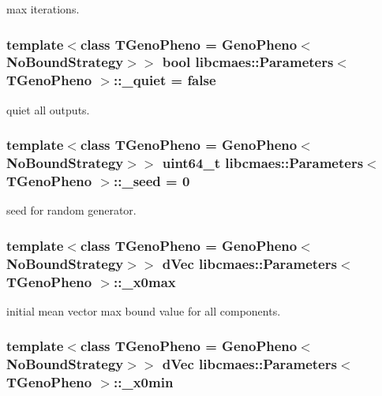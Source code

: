 max iterations. \hypertarget{classlibcmaes_1_1Parameters_a6f6dad55c02a23891e3280cad288295a}{
\subsubsection[{\-\_\-quiet}]{\setlength{\rightskip}{0pt plus 5cm}template$<$class T\-Geno\-Pheno = Geno\-Pheno$<$\-No\-Bound\-Strategy$>$$>$ bool {\bf libcmaes\-::\-Parameters}$<$ T\-Geno\-Pheno $>$\-::\-\_\-quiet = false}}\label{classlibcmaes_1_1Parameters_a6f6dad55c02a23891e3280cad288295a}
quiet all outputs. \hypertarget{classlibcmaes_1_1Parameters_ac6d616c3d5295fec8a0b230592fb767a}{
\subsubsection[{\-\_\-seed}]{\setlength{\rightskip}{0pt plus 5cm}template$<$class T\-Geno\-Pheno = Geno\-Pheno$<$\-No\-Bound\-Strategy$>$$>$ uint64\-\_\-t {\bf libcmaes\-::\-Parameters}$<$ T\-Geno\-Pheno $>$\-::\-\_\-seed = 0}}\label{classlibcmaes_1_1Parameters_ac6d616c3d5295fec8a0b230592fb767a}
seed for random generator. \hypertarget{classlibcmaes_1_1Parameters_aece9694af9bee78bb13b0994db7ac45e}{
\subsubsection[{\-\_\-x0max}]{\setlength{\rightskip}{0pt plus 5cm}template$<$class T\-Geno\-Pheno = Geno\-Pheno$<$\-No\-Bound\-Strategy$>$$>$ d\-Vec {\bf libcmaes\-::\-Parameters}$<$ T\-Geno\-Pheno $>$\-::\-\_\-x0max}}\label{classlibcmaes_1_1Parameters_aece9694af9bee78bb13b0994db7ac45e}
initial mean vector max bound value for all components. \hypertarget{classlibcmaes_1_1Parameters_aa3bb27467698d9cb7fc7e0a83b48800f}{
\subsubsection[{\-\_\-x0min}]{\setlength{\rightskip}{0pt plus 5cm}template$<$class T\-Geno\-Pheno = Geno\-Pheno$<$\-No\-Bound\-Strategy$>$$>$ d\-Vec {\bf libcmaes\-::\-Parameters}$<$ T\-Geno\-Pheno $>$\-::\-\_\-x0min}}\label{classlibcmaes_1_1Parameters_aa3bb27467698d9cb7fc7e0a83b48800f}
